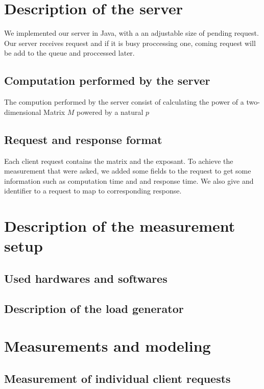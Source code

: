 \section{Description of the server}
\label{sec:Description of the server}
We implemented our server in Java, with a an adjustable size
of pending request. Our server receives request and if it is busy proccessing one,
coming request will be add to the queue and proccessed later.
 
\subsection{Computation performed by the server}
\label{sub:Computation performed by the server}
The compution performed by the server consist of calculating the power of a 
two-dimensional Matrix $M$ powered by a natural $p$
\subsection{Request and response format}
Each client request contains the matrix and the exposant. To achieve the 
measurement that were asked, we added some fields to the request to get 
some information such as computation time and and response time. We also
give and identifier to a request to map to corresponding response. 
\label{sub:Request and response format}

\section{Description of the measurement setup}
\label{sec:Description of the measurement setup}

\subsection{Used hardwares and softwares}
\label{sub:Used hardwares and softwares}

\subsection{Description of the load generator}
\label{sub:Description of the load generator}

\section{Measurements and modeling}
\label{sec:Measurements and modeling}

\subsection{Measurement of individual client requests}
\label{sub:Measurement of individual client requests}


